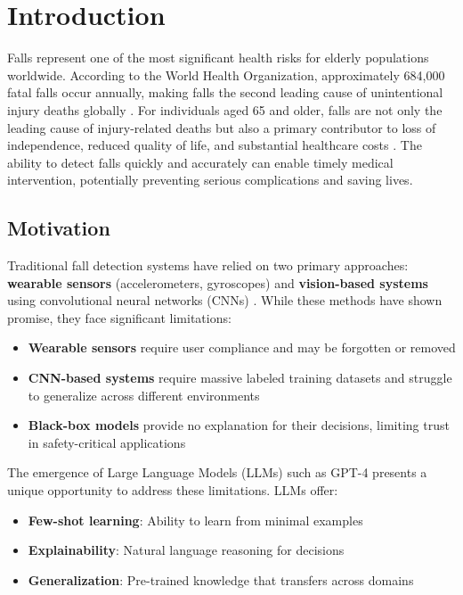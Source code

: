 \documentclass[conference]{IEEEtran}
\begin{document}
\section{Introduction}

Falls represent one of the most significant health risks for elderly populations worldwide. According to the World Health Organization, approximately 684,000 fatal falls occur annually, making falls the second leading cause of unintentional injury deaths globally \cite{who2021falls}. For individuals aged 65 and older, falls are not only the leading cause of injury-related deaths but also a primary contributor to loss of independence, reduced quality of life, and substantial healthcare costs \cite{cdc2020falls}. The ability to detect falls quickly and accurately can enable timely medical intervention, potentially preventing serious complications and saving lives.

\subsection{Motivation}

Traditional fall detection systems have relied on two primary approaches: \textbf{wearable sensors} (accelerometers, gyroscopes) and \textbf{vision-based systems} using convolutional neural networks (CNNs) \cite{noury2007fall, mubashir2013survey}. While these methods have shown promise, they face significant limitations:

\begin{itemize}[leftmargin=*]
    \item \textbf{Wearable sensors} require user compliance and may be forgotten or removed
    \item \textbf{CNN-based systems} require massive labeled training datasets and struggle to generalize across different environments
    \item \textbf{Black-box models} provide no explanation for their decisions, limiting trust in safety-critical applications
\end{itemize}

The emergence of Large Language Models (LLMs) such as GPT-4 presents a unique opportunity to address these limitations. LLMs offer:
\begin{itemize}[leftmargin=*]
    \item \textbf{Few-shot learning}: Ability to learn from minimal examples
    \item \textbf{Explainability}: Natural language reasoning for decisions
    \item \textbf{Generalization}: Pre-trained knowledge that transfers across domains
\end{itemize}
\end{document}
